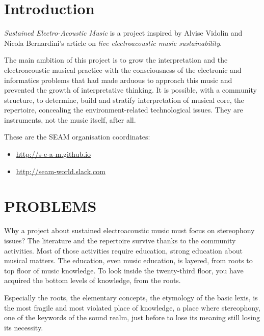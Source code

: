 \documentclass{article}
\title{\papertitle}
\begin{document}
%
\capstartfalse
\maketitle
\capstarttrue
%
\begin{abstract}

\end{abstract}
%

\section{Introduction}
\label{sec:introduction}

\emph{Sustained Electro-Acoustic Music} is a project inspired by Alvise Vidolin
and Nicola Bernardini's article \cite{bevi05} on \emph{live electroacoustic
music sustainability}.

The main ambition of this project is to grow the interpretation and the
electroacoustic musical practice with the consciousness of the electronic
and informatics problems that had made arduous to approach this music and
prevented the growth of interpretative thinking. It is possible, with a
community structure, to determine, build and stratify interpretation of musical
core, the repertoire, concealing the environment-related technological issues.
They are instruments, not the music itself, after all.

These are the SEAM organisation coordinates:
\begin{itemize}
\item \url{http://s-e-a-m.github.io}
\item \url{http://seam-world.slack.com}
\end{itemize}

\section{PROBLEMS}
\label{sec:problems}

Why a project about sustained electroacoustic music must focus on stereophony
issues? The literature and the repertoire survive thanks to the community
activities. Most of those activities require education, strong education about
musical matters. The education, even music education, is layered, from roots
to top floor of music knowledge. To look inside the twenty-third floor, you
have acquired the bottom levels of knowledge, from the roots.

Especially the roots, the elementary concepts, the etymology of the basic lexis,
is the most fragile and most violated place of knowledge, a place where
stereophony, one of the keywords of the sound realm, just before to lose its
meaning still losing its necessity.
\end{document}
